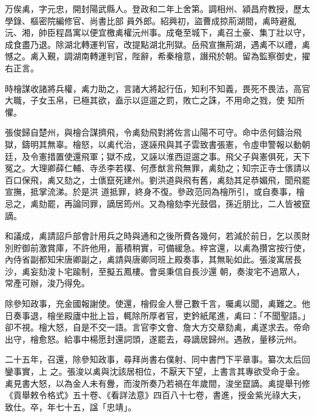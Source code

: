 
\begin{pinyinscope}

 万俟禼，字元忠，開封陽武縣人。登政和二年上舍第。調相州、潁昌府教授，歷太學錄、樞密院編修官、尚書比部
 員外郎。紹興初，盜曹成掠荊湖間，禼時避亂沅、湘，帥臣程昌寓以便宜檄禼權沅州事。成奄至城下，禼召土豪、集丁壯以守，成食盡乃退。除湖北轉運判官，改提點湖北刑獄。岳飛宣撫荊湖，遇禼不以禮，禼憾之。禼入覲，調湖南轉運判官，陛辭，希秦檜意，譖飛於朝。留為監察御史，擢右正言。



 時檜謀收諸將兵權，禼力助之，言諸大將起行伍，知利不知義，畏死不畏法，高官大職，子女玉帛，已極其欲，盍示以逗遛之罰，敗亡之誅，不用命之戮，使
 知所懼。



 張俊歸自楚州，與檜合謀擠飛，令禼劾飛對將佐言山陽不可守。命中丞何鑄治飛獄，鑄明其無辜。檜怒，以禼代治，遂誣飛與其子雲致書張憲，令虛申警報以動朝廷，及令憲措置使還飛軍；獄不成，又誣以淮西逗遛之事。飛父子與憲俱死，天下冤之。大理卿薛仁輔、寺丞李若樸、何彥猷言飛無罪，禼劾之；知宗正寺士㒟請以百口保飛，禼又劾之，士㒟竄死建州。劉洪道與飛有舊，禼劾其足恭媚飛，聞飛罷宣撫，抵掌流涕。於是洪
 道抵罪，終身不復。參政范同為檜所引，或自奏事，檜忌之，禼劾罷，再論同罪，謫居筠州。又為檜劾李光鼓倡，孫近朋比，二人皆被竄謫。



 和議成，禼請詔戶部會計用兵之時與通和之後所費各幾何，若減於前日，乞以羨財別貯御前激賞庫，不許他用，蓄積稍實，可備緩急。梓宮還，以禼為攢宮按行使，內侍省副都知宋唐卿副之，禼請與唐卿同班上殿奏事，其無恥如此。張浚寓居長沙，禼妄劾浚卜宅踰制，至擬五鳳樓。會吳秉信自長沙還
 朝，奏浚宅不過眾人，常產可辦，浚乃得免。



 除參知政事，充金國報謝使。使還，檜假金人譽己數千言，囑禼以聞，禼難之。他日奏事退，檜坐殿廬中批上旨，輒除所厚者官，吏鈐紙尾進，禼曰：「不聞聖語。」卻不視。檜大怒，自是不交一語。言官李文會、詹大方交章劾禼，禼遂求去。帝命出守，檜愈怒。給事中楊愿封還詞頭，遂罷去，尋謫居歸州。遇赦，量移沅州。



 二十五年，召還，除參知政事，尋拜尚書右僕射、同中書門下平章事。纂次太后回鑾事實，上
 之。張浚以禼與沈該居相位，不厭天下望，上書言其專欲受命于金。禼見書大怒，以為金人未有釁，而浚所奏乃若禍在年歲間，浚坐竄謫。禼提舉刊修《貢舉敕令格式》五十卷、《看詳法意》四百八十七卷，書進，授金紫光祿大夫，致仕。卒，年七十五，諡「忠靖」。




\end{pinyinscope}
